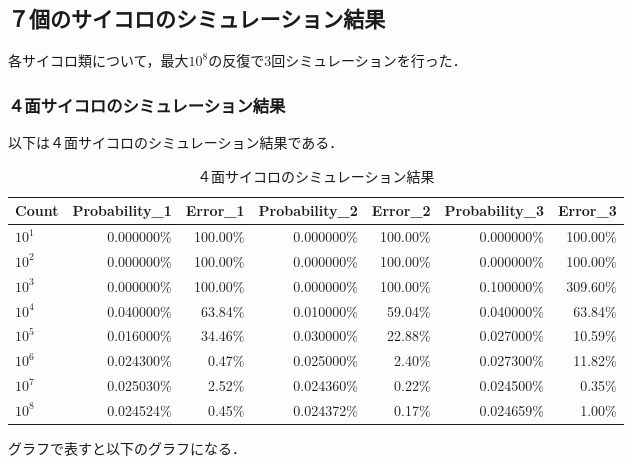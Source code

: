 \documentclass[a4j, titlepage]{jarticle}
\begin{document}
  \subsection{７個のサイコロのシミュレーション結果}
    各サイコロ類について，最大$10^8$の反復で$3$回シミュレーションを行った．
    \subsubsection{４面サイコロのシミュレーション結果}
      以下は４面サイコロのシミュレーション結果である．
      \begin{longtable}[c]{|l|r|r|r|r|r|r|}
        \caption{４面サイコロのシミュレーション結果}
        \label{tab:dice4}\\
        \hline
        \rowcolor[HTML]{C0C0C0} 
        Count    & Probability\_1 & Error\_1 & Probability\_2 & Error\_2 & Probability\_3 & Error\_3 \\ \hline
        \endfirsthead
        \endhead
        $10^1$  & 0.000000\%     & 100.00\%         & 0.000000\%     & 100.00\%         & 0.000000\%     & 100.00\%         \\ \hline
        $10^2$  & 0.000000\%     & 100.00\%         & 0.000000\%     & 100.00\%         & 0.000000\%     & 100.00\%         \\ \hline
        $10^3$  & 0.000000\%     & 100.00\%         & 0.000000\%     & 100.00\%         & 0.100000\%     & 309.60\%         \\ \hline
        $10^4$  & 0.040000\%     & 63.84\%          & 0.010000\%     & 59.04\%          & 0.040000\%     & 63.84\%          \\ \hline
        $10^5$  & 0.016000\%     & 34.46\%          & 0.030000\%     & 22.88\%          & 0.027000\%     & 10.59\%          \\ \hline
        $10^6$  & 0.024300\%     & 0.47\%           & 0.025000\%     & 2.40\%           & 0.027300\%     & \cellcolor[HTML]{FD6864}11.82\%          \\ \hline
        $10^7$  & 0.025030\%     & 2.52\%           & 0.024360\%     & 0.22\%           & 0.024500\%     & 0.35\%           \\ \hline
        $10^8$  & 0.024524\%     & 0.45\%           & 0.024372\%     & 0.17\%           & 0.024659\%     & 1.00\%           \\ \hline
      \end{longtable}

      グラフで表すと以下のグラフになる．
\end{document}
